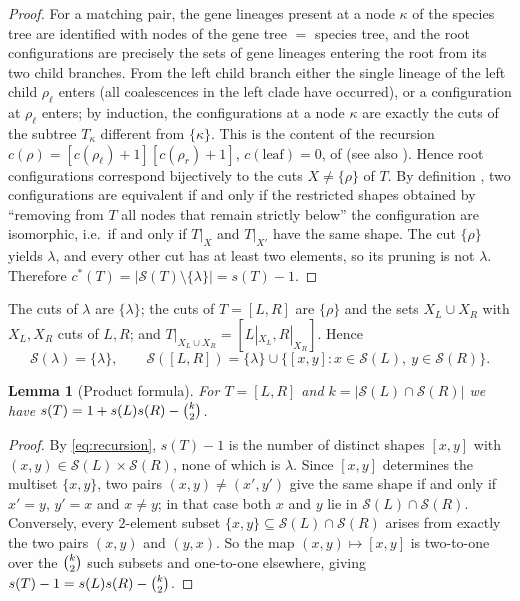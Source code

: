 \documentclass[11pt]{amsart}
\newtheorem{lemma}[theorem]{Lemma}
\theoremstyle{definition}
\theoremstyle{remark}
\newcommand{\lf}{\lambda}
\newcommand{\Sh}{\mathcal{S}}
\newcommand{\cstar}{c^{*}}
\newcommand{\binomtwo}[1]{\tbinom{#1}{2}}
\begin{document}
\begin{proof}
For a matching pair, the gene lineages present at a node $\kappa$ of the species tree are identified with nodes of the gene tree $=$ species tree, and the root configurations are precisely the sets of gene lineages entering the root from its two child branches.
From the left child branch either the single lineage of the left child $\rho_\ell$ enters (all coalescences in the left clade have occurred), or a configuration at $\rho_\ell$ enters; by induction, the configurations at a node $\kappa$ are exactly the cuts of the subtree $T_\kappa$ different from $\{\kappa\}$.
This is the content of the recursion $c(\rho)=[c(\rho_\ell)+1][c(\rho_r)+1]$, $c(\text{leaf})=0$, of \cite[eq.~(5)]{DR2019} (see also \cite[Sect.~2]{DR2017}).
Hence root configurations correspond bijectively to the cuts $X\neq\{\rho\}$ of $T$.
By definition \cite[Sect.~3.1]{DR2019}, two configurations are equivalent if and only if the restricted shapes obtained by ``removing from $T$ all nodes that remain strictly below'' the configuration are isomorphic, i.e.\ if and only if $T|_X$ and $T|_{X'}$ have the same shape.
The cut $\{\rho\}$ yields $\lf$, and every other cut has at least two elements, so its pruning is not $\lf$.
Therefore $\cstar(T)=|\Sh(T)\setminus\{\lf\}|=s(T)-1$.
\end{proof}

The cuts of $\lf$ are $\{\lf\}$; the cuts of $T=[L,R]$ are $\{\rho\}$ and the sets $X_L\cup X_R$ with $X_L,X_R$ cuts of $L,R$; and $T|_{X_L\cup X_R}=[L|_{X_L},R|_{X_R}]$.
Hence
\begin{equation}\label{eq:recursion}
\Sh(\lf)=\{\lf\},\qquad \Sh([L,R])=\{\lf\}\cup\bigl\{[x,y]: x\in\Sh(L),\ y\in\Sh(R)\bigr\}.
\end{equation}

\begin{lemma}[Product formula]\label{lem:product}
For $T=[L,R]$ and $k=|\Sh(L)\cap\Sh(R)|$ we have $s(T)=1+s(L)s(R)-\binomtwo{k}$.
\end{lemma}

\begin{proof}
By \eqref{eq:recursion}, $s(T)-1$ is the number of distinct shapes $[x,y]$ with $(x,y)\in\Sh(L)\times\Sh(R)$, none of which is $\lf$.
Since $[x,y]$ determines the multiset $\{x,y\}$, two pairs $(x,y)\neq(x',y')$ give the same shape if and only if $x'=y$, $y'=x$ and $x\neq y$; in that case both $x$ and $y$ lie in $\Sh(L)\cap\Sh(R)$.
Conversely, every $2$-element subset $\{x,y\}\subseteq\Sh(L)\cap\Sh(R)$ arises from exactly the two pairs $(x,y)$ and $(y,x)$.
So the map $(x,y)\mapsto[x,y]$ is two-to-one over the $\binomtwo{k}$ such subsets and one-to-one elsewhere, giving $s(T)-1=s(L)s(R)-\binomtwo{k}$.
\end{proof}
\end{document}
